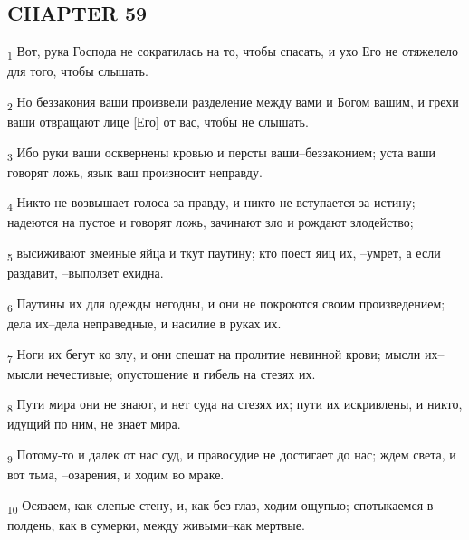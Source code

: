 \subsection{CHAPTER 59}
\begin{tcolorbox}
\textsubscript{1} Вот, рука Господа не сократилась на то, чтобы спасать, и ухо Его не отяжелело для того, чтобы слышать.
\end{tcolorbox}
\begin{tcolorbox}
\textsubscript{2} Но беззакония ваши произвели разделение между вами и Богом вашим, и грехи ваши отвращают лице [Его] от вас, чтобы не слышать.
\end{tcolorbox}
\begin{tcolorbox}
\textsubscript{3} Ибо руки ваши осквернены кровью и персты ваши--беззаконием; уста ваши говорят ложь, язык ваш произносит неправду.
\end{tcolorbox}
\begin{tcolorbox}
\textsubscript{4} Никто не возвышает голоса за правду, и никто не вступается за истину; надеются на пустое и говорят ложь, зачинают зло и рождают злодейство;
\end{tcolorbox}
\begin{tcolorbox}
\textsubscript{5} высиживают змеиные яйца и ткут паутину; кто поест яиц их, --умрет, а если раздавит, --выползет ехидна.
\end{tcolorbox}
\begin{tcolorbox}
\textsubscript{6} Паутины их для одежды негодны, и они не покроются своим произведением; дела их--дела неправедные, и насилие в руках их.
\end{tcolorbox}
\begin{tcolorbox}
\textsubscript{7} Ноги их бегут ко злу, и они спешат на пролитие невинной крови; мысли их--мысли нечестивые; опустошение и гибель на стезях их.
\end{tcolorbox}
\begin{tcolorbox}
\textsubscript{8} Пути мира они не знают, и нет суда на стезях их; пути их искривлены, и никто, идущий по ним, не знает мира.
\end{tcolorbox}
\begin{tcolorbox}
\textsubscript{9} Потому-то и далек от нас суд, и правосудие не достигает до нас; ждем света, и вот тьма, --озарения, и ходим во мраке.
\end{tcolorbox}
\begin{tcolorbox}
\textsubscript{10} Осязаем, как слепые стену, и, как без глаз, ходим ощупью; спотыкаемся в полдень, как в сумерки, между живыми--как мертвые.
\end{tcolorbox}
